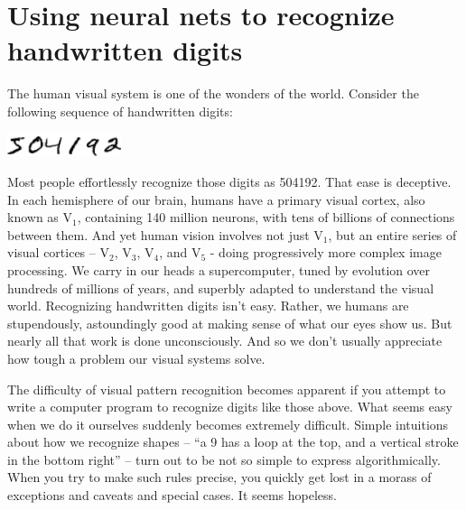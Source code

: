 \documentclass[a4paper,twoside,10pt]{book}
\begin{document}
\chapter{Using neural nets to recognize handwritten digits}

The human visual system is one of the wonders of the world. Consider the following sequence of handwritten digits:
\begin{center}
	\includegraphics[width=0.25\textwidth]{./figures/ch1/digits.png}
\end{center}
Most people effortlessly recognize those digits as 504192. That ease is deceptive. In each hemisphere of our brain, humans have a primary visual cortex, also known as V$_1$, containing 140 million neurons, with tens of billions of connections between them. And yet human vision involves not just V$_1$, but an entire series of visual cortices -- V$_2$, V$_3$, V$_4$, and V$_5$ - doing progressively more complex image processing. We carry in our heads a supercomputer, tuned by evolution over hundreds of millions of years, and superbly adapted to understand the visual world. Recognizing handwritten digits isn't easy. Rather, we humans are stupendously, astoundingly good at making sense of what our eyes show us. But nearly all that work is done unconsciously. And so we don't usually appreciate how tough a problem our visual systems solve.

The difficulty of visual pattern recognition becomes apparent if you attempt to write a computer program to recognize digits like those above. What seems easy when we do it ourselves suddenly becomes extremely difficult. Simple intuitions about how we recognize shapes -- ``a 9 has a loop at the top, and a vertical stroke in the bottom right'' -- turn out to be not so simple to express algorithmically. When you try to make such rules precise, you quickly get lost in a morass of exceptions and caveats and special cases. It seems hopeless.
\end{document}
